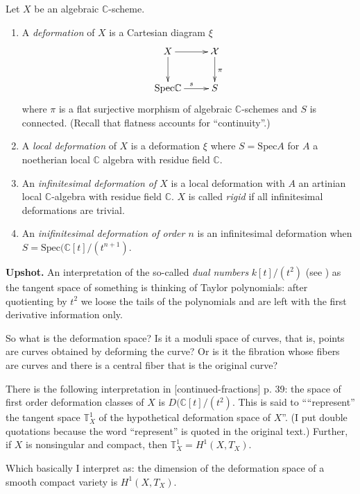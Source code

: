 \begin{definition}
\label{definition-deformation}
Let $X$ be an algebraic $\mathbb{C}$-scheme.
\begin{enumerate}
\item A {\it deformation} of $X$ is a Cartesian diagram $\xi$
$$
\xymatrix{
X\ar[r]\ar[d]&\mathcal{X}\ar[d]^{\pi}\\
\text{Spec}\mathbb{C}\ar[r]^s&S
}
$$
where $\pi$ is a flat surjective morphism of algebraic $\mathbb{C}$-schemes and
$S$ is connected. (Recall that flatness accounts for ``continuity''.)
\item A {\it local deformation} of $X$ is a deformation $\xi$ where
$S=\text{Spec}A$ for $A$ a noetherian local $\mathbb{C}$ algebra with residue
field $\mathbb{C}$.
\item An {\it infinitesimal deformation of $X$} is a local deformation with $A$
an artinian local $\mathbb{C}$-algebra with residue field $\mathbb{C}$. $X$ is
called {\it rigid} if all infinitesimal deformations are trivial.
\item An {\it inifinitesimal deformation of order $n$} is an infinitesimal
deformation when $S=\text{Spec}(\mathbb{C}[t]/(t^{n+1})$.
\end{enumerate}
\end{definition}

{\bf Upshot.} An interpretation of the so-called {\it dual numbers}
$k[t]/(t^2)$ (see \cite{Hartshorne-deformation}) as the tangent space of
something is thinking of Taylor polynomials: after quotienting by $t^2$ we loose
the tails of the polynomials and are left with the first derivative information
only.

So what is the deformation space? Is it a moduli space of curves, that is,
points are curves obtained by deforming the curve? Or is it the fibration whose
fibers are curves and there is a central fiber that is the original curve?

There is the following interpretation in [continued-fractions] p. 39: the space
of first order deformation classes of $X$ is $D(\mathbb{C}[t]/(t^2)$. This is
said to ````represent'' the tangent space $\mathbb{T}^1_X$ of the hypothetical
deformation space of $X$''. (I put double quotations because the word
``represent'' is quoted in the original text.) Further, if $X$ is nonsingular
and compact, then $\mathbb{T}^1_X=H^{1}(X,T_X)$.

Which basically I interpret as: the dimension of the deformation space of a
smooth compact variety is $H^{1}(X,T_X)$.


